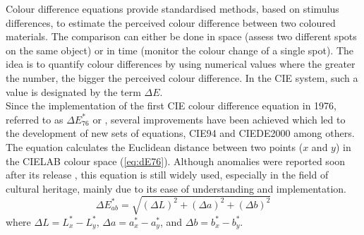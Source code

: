 Colour difference equations provide standardised methods, based on stimulus differences, to estimate the perceived colour difference between two coloured materials. The comparison can either be done in space (assess two different spots on the same object) or in time (monitor the colour change of a single spot). The idea is to quantify colour differences by using numerical values where the greater the number, the bigger the perceived colour difference. In the \gls{CIE} system, such a value is designated by the term $\Delta E$.\\

Since the implementation of the first \gls{CIE} colour difference equation in 1976, referred to as $\Delta E^*_{76}$ or \dEab, several improvements have been achieved which led to the development of new sets of equations, CIE94 and CIEDE2000 among others. The \dEab equation calculates the Euclidean distance between two points ($x$ and $y$) in the CIELAB colour space (\ref{eq:dE76}). Although anomalies were reported soon after its release \citep{kuehni_color-tolerance_1976, mclaren_cielab_1980}, this equation is still widely used, especially in the field of cultural heritage, mainly due to its ease of understanding and implementation.\\

\begin{equation}
    \Delta E^*_{ab} = \sqrt{(\Delta L)^2 + (\Delta a)^2 + (\Delta b)^2}
\label{eq:dE76}
\end{equation}
where $\Delta L = L^*_x - L^*_y$, $\Delta a = a^*_x - a^*_y$, and $\Delta b = b^*_x - b^*_y$.\\

